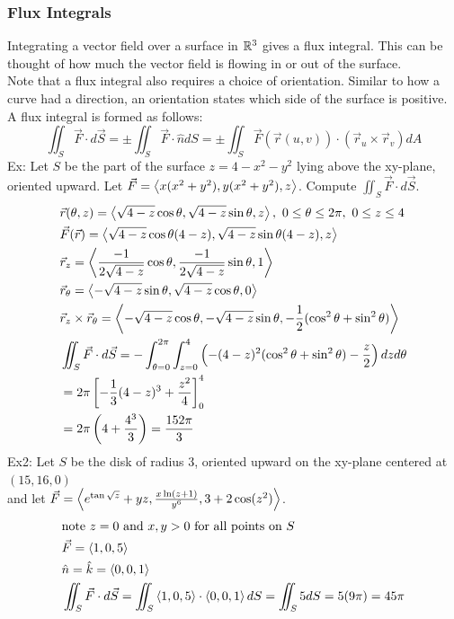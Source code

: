 \documentclass[11pt, fleqn]{article}
\begin{document}
\subsubsection{Flux Integrals}
Integrating a vector field over a surface in $\mathbb{R}^3$ gives a flux integral. This can be thought of how much the vector field is flowing in or out of the surface.\\
Note that a flux integral also requires a choice of orientation. Similar to how a curve had a direction, an orientation states which side of the surface is positive.\\
A flux integral is formed as follows:
$$\iint_S\vec{F}\cdot d\vec{S}=\pm\iint_S\vec{F}\cdot\hat{n} dS=\pm\iint_S\vec{F}(\vec{r}(u,v))\cdot(\vec{r}_u\times\vec{r}_v)dA$$
Ex: Let $S$ be the part of the surface $z=4-x^2-y^2$ lying above the xy-plane, oriented upward. Let $\vec{F}=\left\langle x(x^2+y^2),y(x^2+y^2),z \right\rangle$. Compute $\iint_S\vec{F}\cdot d\vec{S}$.
\begin{align*}
    &\vec{r}(\theta,z)=\brangle{\sqrt{4-z}\cos\theta,\sqrt{4-z}\sin\theta,z},\ 0\leq\theta\leq 2\pi,\ 0\leq z\leq 4\\
    &\vec{F}(\vec{r})=\brangle{\sqrt{4-z}\cos\theta(4-z),\sqrt{4-z}\sin\theta(4-z),z}\\
    &\vec{r}_z=\brangle{\frac{-1}{2\sqrt{4-z}}\cos\theta,\frac{-1}{2\sqrt{4-z}}\sin\theta,1}\\
    &\vec{r}_\theta=\brangle{-\sqrt{4-z}\sin\theta,\sqrt{4-z}\cos\theta,0}\\
    &\vec{r}_z\times\vec{r}_\theta=\brangle{-\sqrt{4-z}\cos\theta,-\sqrt{4-z}\sin\theta,-\frac{1}{2}(\cos^2\theta+\sin^2\theta)}\\
    &\iint_S\vec{F}\cdot d\vec{S}=-\int_{\theta=0}^{2\pi}\int_{z=0}^4\brround{-(4-z)^2(\cos^2\theta+\sin^2\theta)-\frac{z}{2}}dzd\theta\\
    &=2\pi\brsquare{-\frac{1}{3}(4-z)^3+\frac{z^2}{4}}_0^4\\
    &=2\pi\brround{4+\frac{4^3}{3}}=\frac{152\pi}{3}
\end{align*}
Ex2: Let $S$ be the disk of radius 3, oriented upward on the xy-plane centered at $(15,16,0)$\\
and let $\vec{F}=\left\langle e^{\tan{\sqrt{z}}}+yz,\frac{x\ln(z+1)}{y^6},3+2\cos(z^2) \right\rangle$.
\begin{align*}
    &\text{note $z=0$ and $x,y>0$ for all points on $S$}\\
    &\vec{F}=\left\langle 1,0,5 \right\rangle\\
    &\hat{n}=\hat{k}=\left\langle 0,0,1 \right\rangle\\
    &\iint_S\vec{F}\cdot d\vec{S}=\iint_S\left\langle 1,0,5 \right\rangle\cdot\left\langle 0,0,1 \right\rangle dS=\iint_S5dS=5(9\pi)=45\pi
\end{align*}
\end{document}
